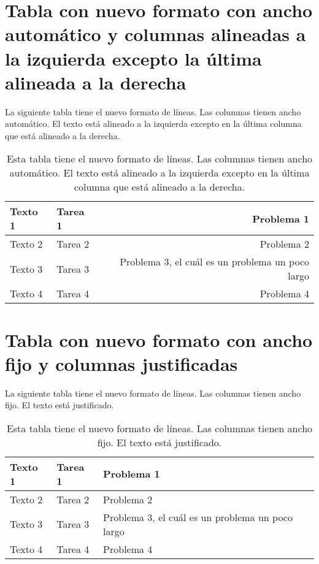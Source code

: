 \section*{Tabla con nuevo formato con ancho automático y columnas alineadas a la izquierda excepto la última alineada a la derecha}

La siguiente tabla tiene el nuevo formato de líneas. Las columnas tienen ancho automático. El texto está alineado a la izquierda excepto en la última columna que está alineado a la derecha.

\begin{table}[h]
	\centering
	\begin{tabular}{l l r}
		\toprule[2pt]
		\textbf{Texto 1} & \textbf{Tarea 1} & \textbf{Problema 1} \\
		\midrule[1.5pt]
		Texto 2 & Tarea 2 & Problema 2 \\
		\hline
		Texto 3 & Tarea 3 & Problema 3, el cuál es un problema un poco largo \\
		\hline
		Texto 4 & Tarea 4 & Problema 4 \\
		\bottomrule[2pt]
	\end{tabular}
	\caption[Tabla con nuevo formato con ancho automático y columnas alineadas a la izquierda excepto la última alineada a la derecha]{Esta tabla tiene el nuevo formato de líneas. Las columnas tienen ancho automático. El texto está alineado a la izquierda excepto en la última columna que está alineado a la derecha.}
	\label{table9}
\end{table}

\section*{Tabla con nuevo formato con ancho fijo y columnas justificadas}

La siguiente tabla tiene el nuevo formato de líneas. Las columnas tienen ancho fijo. El texto está justificado.

\begin{table}[h]
	\centering
	\begin{tabular}{p{2cm} p{2.5cm} p{5cm}}
		\toprule[2pt]
		\textbf{Texto 1} & \textbf{Tarea 1} & \textbf{Problema 1} \\
		\midrule[1.5pt]
		Texto 2 & Tarea 2 & Problema 2 \\
		\hline
		Texto 3 & Tarea 3 & Problema 3, el cuál es un problema un poco largo \\
		\hline
		Texto 4 & Tarea 4 & Problema 4 \\
		\bottomrule[2pt]
	\end{tabular}
	\caption[Tabla con nuevo formato con ancho fijo y columnas justificadas]{Esta tabla tiene el nuevo formato de líneas. Las columnas tienen ancho fijo. El texto está justificado.}
	\label{table10}
\end{table}

